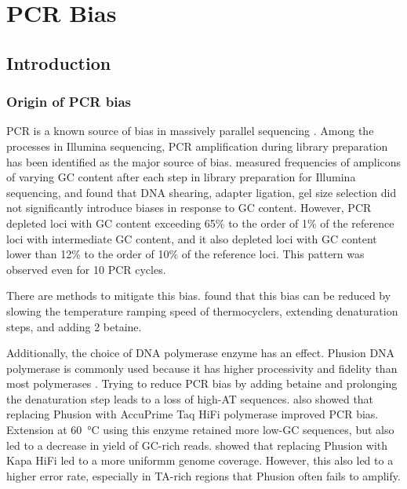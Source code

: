 \documentclass[parskip=full, numbers=noenddot]{scrreprt}
\begin{document}
\chapter{PCR Bias}
\label{ch:pcrbias}

\section{Introduction}
\label{sec:pcrbias_intro}

\subsection{Origin of PCR bias}
\label{ssec:pcrbias_intro_origin}

PCR is a known source of bias in massively parallel sequencing \citep{olova_comparison_2018}.  Among the processes in Illumina sequencing, PCR amplification during library preparation has been identified as the major source of bias.
\citet{aird_analyzing_2011} measured frequencies of amplicons of varying GC content after each step in library preparation for Illumina sequencing, and found that DNA shearing, adapter ligation, gel size selection did not significantly introduce biases in response to GC content.  However, PCR depleted loci with GC content exceeding 65\% to the order of 1\% of the reference loci with intermediate GC content, and it also depleted loci with GC content lower than 12\% to the order of 10\% of the reference loci.  This pattern was observed even for 10 PCR cycles.

There are methods to mitigate this bias.  \citet{aird_analyzing_2011} found that this bias can be reduced by slowing the temperature ramping speed of thermocyclers, extending denaturation steps, and adding \SI{2}{\Molar} betaine.

Additionally, the choice of DNA polymerase enzyme has an effect.  Phusion DNA polymerase is commonly used because it has higher processivity and fidelity than most polymerases \citep{quail_optimal_2012}. Trying to reduce PCR bias by adding betaine and prolonging the denaturation step leads to a loss of high-AT sequences.  \citet{aird_analyzing_2011} also showed that replacing Phusion with AccuPrime Taq HiFi polymerase improved PCR bias.  Extension at \SI{60}{\celsius} using this enzyme retained more low-GC sequences, but also led to a decrease in yield of GC-rich reads.  \citet{quail_optimal_2012} showed that replacing Phusion with Kapa HiFi led to a more uniformm genome coverage.  However, this also led to a higher error rate, especially in TA-rich regions that Phusion often fails to amplify.
\end{document}
